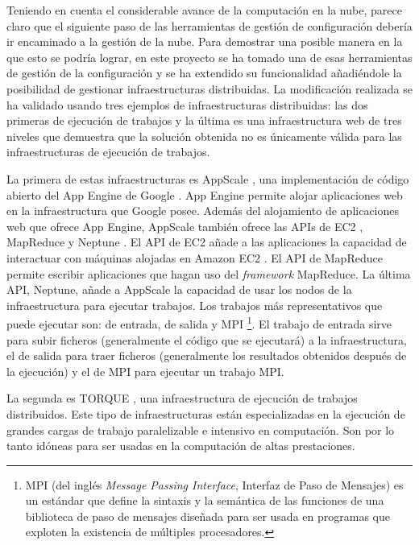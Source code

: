 Teniendo en cuenta el considerable avance de la computación en la nube, parece claro que el siguiente paso de las herramientas de gestión de configuración debería ir encaminado a la gestión de la nube. Para demostrar una posible manera en la que esto se podría lograr, en este proyecto se ha tomado una de esas herramientas de gestión de la configuración y se ha extendido su funcionalidad añadiéndole la posibilidad de gestionar infraestructuras distribuidas. La modificación realizada se ha validado usando tres ejemplos de infraestructuras distribuidas: las dos primeras de ejecución de trabajos y la última es una infraestructura web de tres niveles que demuestra que la solución obtenida no es únicamente válida para las infraestructuras de ejecución de trabajos.

La primera de estas infraestructuras es AppScale \cite{appscale}, una implementación de código abierto del App Engine de Google \cite{appengine}. App Engine permite alojar aplicaciones web en la infraestructura que Google posee. Además del alojamiento de aplicaciones web que ofrece App Engine, AppScale también ofrece las APIs de EC2 \cite{appscale-ec2}, MapReduce \cite{appscale-mapreduce} y Neptune \cite{appscale-neptune}. El API de EC2 añade a las aplicaciones la capacidad de interactuar con máquinas alojadas en Amazon EC2 \cite{amazon-ec2}. El API de MapReduce permite escribir aplicaciones que hagan uso del \emph{framework} MapReduce. La última API, Neptune, añade a AppScale la capacidad de usar los nodos de la infraestructura para ejecutar trabajos. Los trabajos más representativos que puede ejecutar son: de entrada, de salida y MPI \footnote[1]{MPI (del inglés \emph{Message Passing Interface}, Interfaz de Paso de Mensajes) es un estándar que define la sintaxis y la semántica de las funciones de una biblioteca de paso de mensajes diseñada para ser usada en programas que exploten la existencia de múltiples procesadores.}. El trabajo de entrada sirve para subir ficheros (generalmente el código que se ejecutará) a la infraestructura, el de salida para traer ficheros (generalmente los resultados obtenidos después de la ejecución) y el de MPI para ejecutar un trabajo MPI.

La segunda es TORQUE \cite{Staples:2006:TRM:1188455.1188464, torque}, una infraestructura de ejecución de trabajos distribuidos. Este tipo de infraestructuras están especializadas en la ejecución de grandes cargas de trabajo paralelizable e intensivo en computación. Son por lo tanto idóneas para ser usadas en la computación de altas prestaciones.

